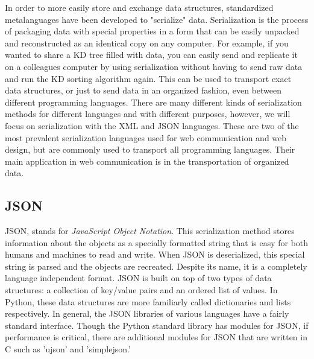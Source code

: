 \label{lab:webtech}

In order to more easily store and exchange data structures, standardized metalanguages have been developed to "serialize" data.
Serialization is the process of packaging data with special properties in a form that can be easily unpacked and reconstructed as an identical copy on any computer.
For example, if you wanted to share a KD tree filled with data, you can easily send and replicate it on a colleagues computer by using serialization without having to send raw data and run the KD sorting algorithm again.
This can be used to transport exact data structures, or just to send data in an organized fashion, even between different programming languages.
There are many different kinds of serialization methods for different languages and with different purposes, however, we will focus on serialization with the XML and JSON languages.
These are two of the most prevalent serialization languages used for web communication and web design, but are commonly used to transport all programming languages.
Their main application in web communication is in the transportation of organized data.
 

\subsection*{JSON}
JSON, stands for \emph{JavaScript Object Notation}.
This serialization method stores information about the objects as a specially formatted string that is easy for both humans and machines to read and write.
When JSON is deserialized, this special string is parsed and the objects are recreated.
Despite its name, it is a completely language independent format.
JSON is built on top of two types of data structures: a collection of key/value pairs and an ordered list of values.
In Python, these data structures are more familiarly called dictionaries and lists respectively.
In general, the JSON libraries of various languages have a fairly standard interface.
Though the Python standard library has modules for JSON, if performance is critical, there are additional modules for JSON that are written in C such as 'ujson' and 'simplejson.'

